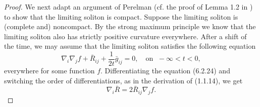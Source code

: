 \begin{proof}
We next adapt an argument of Perelman (cf. the proof of Lemma 1.2
in \cite{P2}) to show that the limiting soliton is compact.
Suppose the limiting soliton is (complete and) noncompact. By the
strong maximum principle we know that the limiting soliton also
has strictly positive curvature everywhere. After a shift of the
time, we may assume that the limiting soliton satisfies the
following equation \begin{equation} \nabla_i\nabla_j
f+\bar{R}_{ij}+\frac{1}{2t}\bar{g}_{ij}=0,\quad
\mbox{on }\;  -\infty<t<0, %
\end{equation} everywhere for some function $f$. Differentiating the equation
(6.2.24) and switching the order of differentiations, as in the
derivation of (1.1.14), we get \begin{equation}
\nabla_i\bar{R}=2\bar{R}_{ij}\nabla_jf. %
\end{equation}


\end{proof}
